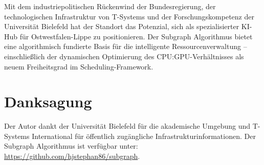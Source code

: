 ﻿\documentclass[a4paper,12pt]{article}
\theoremstyle{definition}
\begin{document}
Mit dem industriepolitischen R\"{u}ckenwind der Bundesregierung, der technologischen Infrastruktur von T-Systems und der Forschungskompetenz der Universit\"{a}t Bielefeld hat der Standort das Potenzial, sich als spezialisierter KI-Hub f\"{u}r Ostwestfalen-Lippe zu positionieren.
Der Subgraph Algorithmus bietet eine algorithmisch fundierte Basis f\"{u}r die intelligente Ressourcenverwaltung -- einschlie{\ss}lich der dynamischen Optimierung des CPU:GPU-Verh\"{a}ltnisses als neuem Freiheitsgrad im Scheduling-Framework.

\section*{Danksagung}

Der Autor dankt der Universit\"{a}t Bielefeld f\"{u}r die akademische Umgebung und T-Systems International f\"{u}r \"{o}ffentlich zug\"{a}ngliche Infrastrukturinformationen.
Der Subgraph Algorithmus ist verf\"{u}gbar unter: \url{https://github.com/hjstephan86/subgraph}.
\end{document}

